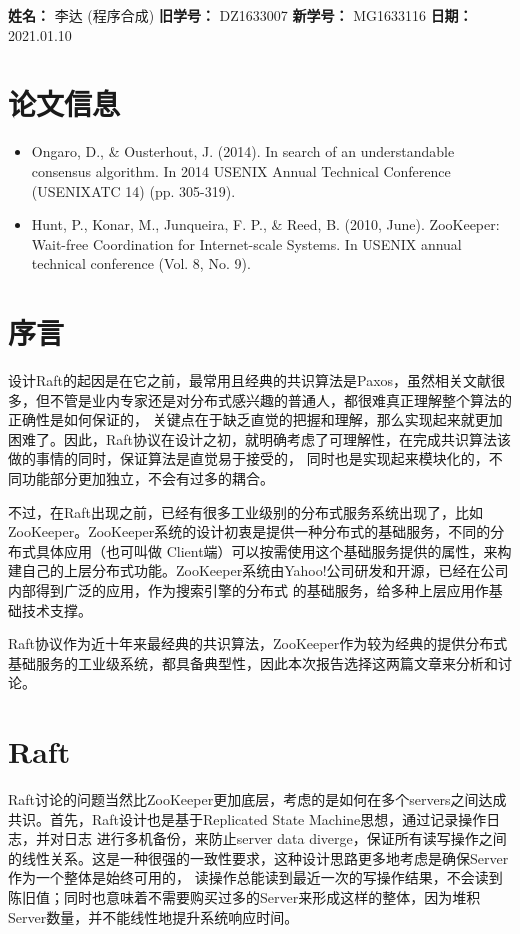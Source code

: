 \documentclass[UTF8]{article}
\begin{document}
    
{\flushleft \bf \Large 姓名：} 李达 (程序合成)
{\flushleft \bf \Large 旧学号：} DZ1633007
{\flushleft \bf \Large 新学号：} MG1633116
{\flushleft \bf \Large 日期：} 2021.01.10

\section*{论文信息}
\begin{itemize}
    \item Ongaro, D., \& Ousterhout, J. (2014). 
    In search of an understandable consensus algorithm. 
    In 2014 {USENIX} Annual Technical Conference ({USENIX}{ATC} 14) (pp. 305-319).
    \item Hunt, P., Konar, M., Junqueira, F. P., \& Reed, B. (2010, June). 
    ZooKeeper: Wait-free Coordination for Internet-scale Systems. 
    In USENIX annual technical conference (Vol. 8, No. 9).
\end{itemize}
    
\section{序言}
设计Raft的起因是在它之前，最常用且经典的共识算法是Paxos，虽然相关文献很多，但不管是业内专家还是对分布式感兴趣的普通人，都很难真正理解整个算法的正确性是如何保证的，
关键点在于缺乏直觉的把握和理解，那么实现起来就更加困难了。因此，Raft协议在设计之初，就明确考虑了可理解性，在完成共识算法该做的事情的同时，保证算法是直觉易于接受的，
同时也是实现起来模块化的，不同功能部分更加独立，不会有过多的耦合。

不过，在Raft出现之前，已经有很多工业级别的分布式服务系统出现了，比如ZooKeeper。ZooKeeper系统的设计初衷是提供一种分布式的基础服务，不同的分布式具体应用（也可叫做
Client端）可以按需使用这个基础服务提供的属性，来构建自己的上层分布式功能。ZooKeeper系统由Yahoo!公司研发和开源，已经在公司内部得到广泛的应用，作为搜索引擎的分布式
的基础服务，给多种上层应用作基础技术支撑。

Raft协议作为近十年来最经典的共识算法，ZooKeeper作为较为经典的提供分布式基础服务的工业级系统，都具备典型性，因此本次报告选择这两篇文章来分析和讨论。

\section{Raft}
Raft讨论的问题当然比ZooKeeper更加底层，考虑的是如何在多个servers之间达成共识。首先，Raft设计也是基于Replicated State Machine思想，通过记录操作日志，并对日志
进行多机备份，来防止server data diverge，保证所有读写操作之间的线性关系。这是一种很强的一致性要求，这种设计思路更多地考虑是确保Server作为一个整体是始终可用的，
读操作总能读到最近一次的写操作结果，不会读到陈旧值；同时也意味着不需要购买过多的Server来形成这样的整体，因为堆积Server数量，并不能线性地提升系统响应时间。
\end{document}
